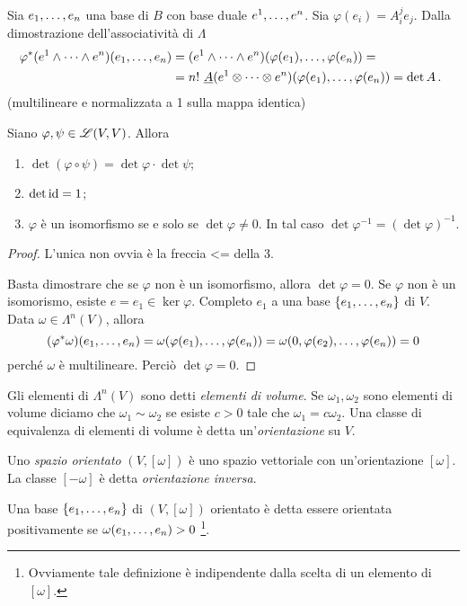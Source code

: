 \begin{proposition}
	Sia $\seqb en,$ una base di $B$ con base duale $\seqa en,$. Sia $\varphi(e_i) = A_i^je_j$.
	Dalla dimostrazione dell'associatività di $\Lambda$
	\begin{align*}
		\varphi^*(\seqa en\wedge) (\seqb en,) &= (\seqa en\wedge)(\varphi(e_1),\ldots, \varphi(e_n)) =\\
		&=n!\ \antisimm (\seqa en\otimes)(\varphi(e_1),\ldots,\varphi(e_n)) = \det A
		\punto
	\end{align*}
	(multilineare e normalizzata a 1 sulla mappa identica)
\end{proposition}

\begin{proposition}
	Siano $\varphi,\psi \in\Lin(V,V)$. Allora
	\begin{enumerate}
		\item $\det(\varphi\circ\psi) = \det \varphi \cdot \det \psi$;
		\item $\det \id = 1$;
		\item $\varphi$ è un isomorfismo se e solo se $\det\varphi\not=0$. In tal caso $\det\varphi^{-1} = (\det \varphi)^{-1}$.
	\end{enumerate}
\end{proposition}
\begin{proof}
	L'unica non ovvia è la freccia <= della 3.
	
	Basta dimostrare che se $\varphi$ non è un isomorfismo, allora $\det\varphi = 0$.
	Se $\varphi$ non è un isomorismo, esiste $e=e_1\in\ker\varphi$. Completo $e_1$ a una base $\{\seqb en,\}$ di $V$. Data $\omega\in\Lambda^n(V)$, allora
	\begin{equation*}
		(\varphi^*\omega)(\seqb en,) = \omega(\varphi(e_1),\ldots,\varphi(e_n)) = \omega(0,\varphi(e_2),\ldots,\varphi(e_n)) = 0
	\end{equation*}
	perché $\omega$ è multilineare. Perciò $\det\varphi = 0$.
\end{proof}

\begin{definition} 
	Gli elementi di $\Lambda^n(V)$ sono detti \emph{elementi di volume}. Se $\omega_1,\omega_2$ sono elementi di volume diciamo che $\omega_1\sim \omega_2$ se esiste $c>0$ tale che $\omega_1 = c\omega_2$. Una classe di equivalenza di elementi di volume è detta un'\emph{orientazione} su $V$.
	
	Uno \emph{spazio orientato} $(V, [\omega])$ è uno spazio vettoriale con un'orientazione $[\omega]$. La classe $[-\omega]$ è detta \emph{orientazione inversa}.
	
	Una base $\{\seqb en,\}$ di $(V,[\omega])$ orientato è detta essere orientata positivamente se $\omega(\seqb en,)>0$ \footnote{Ovviamente tale definizione è indipendente dalla scelta di un elemento di $[\omega]$.}.
\end{definition}

